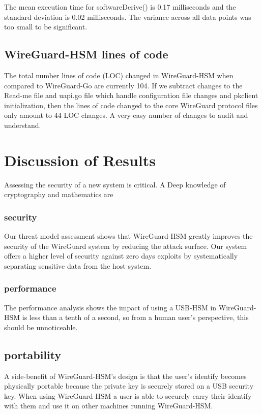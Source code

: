 \documentclass [11pt, proquest] {uwthesis}[2020/02/24]
\begin{document}
The mean execution time for softwareDerive() is 0.17 milliseconds and the standard deviation is 0.02 milliseconds. The variance across all data points was too small to be significant.

\section{WireGuard-HSM lines of code}
The total number lines of code (LOC) changed in WireGuard-HSM when compared to WireGuard-Go are currently 104. If we subtract changes to the Read-me file and uapi.go file which handle configuration file changes and pkclient initialization, then the lines of code changed to the core WireGuard protocol files only amount to 44 LOC changes. A very easy number of changes to audit and understand.

\chapter {Discussion of Results}

Assessing the security of a new system is critical. A Deep knowledge of cryptography and mathematics are 

\subsection{security}
Our threat model assessment shows that WireGuard-HSM greatly improves the security of the WireGuard system by reducing the attack surface. Our system offers a higher level of security against zero days exploits by systematically separating sensitive data from the host system.

\subsection{performance}
The performance analysis shows the impact of using a USB-HSM in  WireGuard-HSM is less than a tenth of a second, so from a human user's perspective, this should be unnoticeable.
\section{portability}

A side-benefit of WireGuard-HSM's design is that the user's identify becomes physically portable because the private key is securely stored on a USB security key. When using WireGuard-HSM a user is able to securely carry their identify with them and use it on other machines running WireGuard-HSM.
\end{document}
